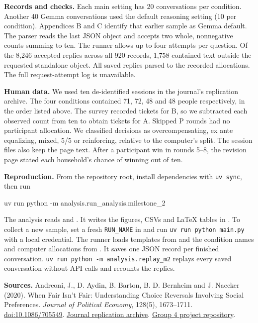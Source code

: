\documentclass[11pt,letterpaper]{article}
\newcommand{\head}[1]{\par\vspace{1pt}\noindent\textbf{#1}\hspace{.3em}}
\begin{document}
\head{Records and checks.} Each main setting has 20 conversations per condition. Another 40 Gemma conversations used the default reasoning setting (10 per condition). Appendices B and C identify that earlier sample as Gemma default. The parser reads the last JSON object and accepts two whole, nonnegative counts summing to ten. The runner allows up to four attempts per question. Of the 8,246 accepted replies across all 920 records, 1,758 contained text outside the requested standalone object. All saved replies parsed to the recorded allocations. The full request-attempt log is unavailable.

\head{Human data.} We used ten de-identified sessions in the journal's replication archive. The four conditions contained 71, 72, 48 and 48 people respectively, in the order listed above. The survey recorded tickets for B, so we subtracted each observed count from ten to obtain tickets for A. Skipped P rounds had no participant allocation. We classified decisions as overcompensating, ex ante equalizing, mixed, 5/5 or reinforcing, relative to the computer's split. The session files also keep the page text. After a participant win in rounds 5--8, the revision page stated each household's chance of winning out of ten.

\head{Reproduction.} From the repository root, install dependencies with \texttt{uv sync}, then run
\par{\small\ttfamily uv run python -m analysis.run\_analysis.milestone\_2\par}
The analysis reads  and . It writes the figures, CSVs and LaTeX tables in . To collect a new sample, set a fresh \texttt{RUN\_NAME} in  and run \texttt{uv run python main.py} with a local credential. The runner loads templates from  and the condition names and computer allocations from . It saves one JSON record per finished conversation. \texttt{uv run python -m analysis.replay\_m2} replays every saved conversation without API calls and recounts the replies.

{\small\head{Sources.} Andreoni, J., D. Aydin, B. Barton, B. D. Bernheim and J. Naecker (2020). When Fair Isn’t Fair: Understanding Choice Reversals Involving Social Preferences. \textit{Journal of Political Economy}, 128(5), 1673--1711. \href{https://doi.org/10.1086/705549}{doi:10.1086/705549}. \href{https://www.journals.uchicago.edu/doi/suppl/10.1086/705549/suppl_file/2016200data.zip}{Journal replication archive}. \href{https://github.com/leona5139/choice_reversals}{Group 4 project repository}.}
\end{document}
